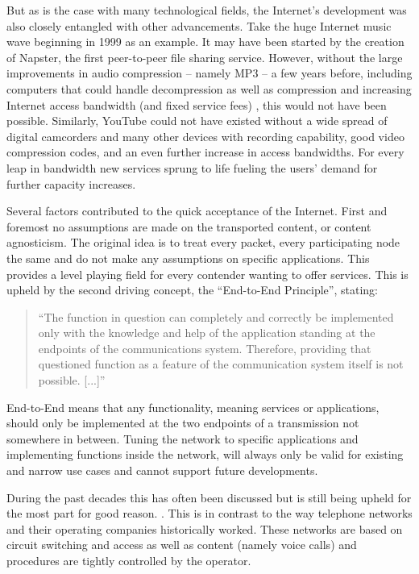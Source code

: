 But as is the case with many technological fields, the Internet's development was also closely entangled with other advancements. Take the huge Internet music wave beginning in 1999 as an example. It may have been started by the creation of Napster, the first peer-to-peer file sharing service. However, without the large improvements in audio compression -- namely MP3 -- a few years before, including computers that could handle decompression as well as compression and increasing Internet access bandwidth (and fixed service fees) , this would not have been possible. Similarly, YouTube could not have existed without a wide spread of digital camcorders and many other devices with recording capability, good video compression codes, and an even further increase in access bandwidths.
 For every leap in bandwidth new services sprung to life fueling the users' demand for further capacity increases. 


Several factors contributed to the quick acceptance of the Internet. First and foremost no assumptions are made on the transported content, or content agnosticism. The original idea is to treat every packet, every participating node the same and do not make any assumptions on specific applications. This provides a level playing field for every contender wanting to offer services. This is upheld by the second driving concept, the ``End-to-End Principle'', \cite{saltzer1984end2end} stating:

\begin{quote}
``The function in question can completely and correctly be implemented only with the knowledge and help of the application standing at the endpoints of the communications system. Therefore, providing that questioned function as a feature of the communication system itself is not possible. [...]''
\end{quote}

End-to-End means that any functionality, meaning services or applications, should only be implemented at the two endpoints of a transmission not somewhere in between. Tuning the network to specific applications and implementing functions inside the network, will always only be valid for existing and narrow use cases and cannot support future developments.

During the past decades this has often been discussed  \cite{bhattacharjee1997active, blumenthal2001rethinking, isenberg1997rise, lemley2000end} but is still being upheld for the most part for good reason. . This is in contrast to the way telephone networks and their operating companies historically worked. These networks are based on circuit switching and access as well as content (namely voice calls) and procedures are tightly controlled by the operator.

